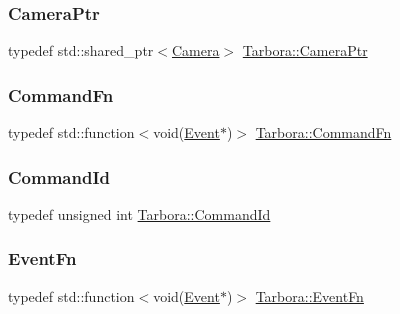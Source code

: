 \subsubsection{\texorpdfstring{Camera\+Ptr}{CameraPtr}}
{\footnotesize\ttfamily typedef std\+::shared\+\_\+ptr$<$\hyperlink{classTarbora_1_1Camera}{Camera}$>$ \hyperlink{namespaceTarbora_ae4a9d4d5fbd397316e4c5cdba64ded4d}{Tarbora\+::\+Camera\+Ptr}}

\mbox{\label{namespaceTarbora_a20140292404b48531b04defa2af01724}} 
\subsubsection{\texorpdfstring{Command\+Fn}{CommandFn}}
{\footnotesize\ttfamily typedef std\+::function$<$void(\hyperlink{structTarbora_1_1Event}{Event}$\ast$)$>$ \hyperlink{namespaceTarbora_a20140292404b48531b04defa2af01724}{Tarbora\+::\+Command\+Fn}}

\mbox{\label{namespaceTarbora_a80dd00c7124f78a02d3d899eb0edbd29}} 
\subsubsection{\texorpdfstring{Command\+Id}{CommandId}}
{\footnotesize\ttfamily typedef unsigned int \hyperlink{namespaceTarbora_a80dd00c7124f78a02d3d899eb0edbd29}{Tarbora\+::\+Command\+Id}}

\mbox{\label{namespaceTarbora_a418b0f026f0664511b2a0c4129edc11f}} 
\subsubsection{\texorpdfstring{Event\+Fn}{EventFn}}
{\footnotesize\ttfamily typedef std\+::function$<$void(\hyperlink{structTarbora_1_1Event}{Event}$\ast$)$>$ \hyperlink{namespaceTarbora_a418b0f026f0664511b2a0c4129edc11f}{Tarbora\+::\+Event\+Fn}}

\mbox{\label{namespaceTarbora_a5373bb1f8a65622379828cdefc8d42e5}} 

